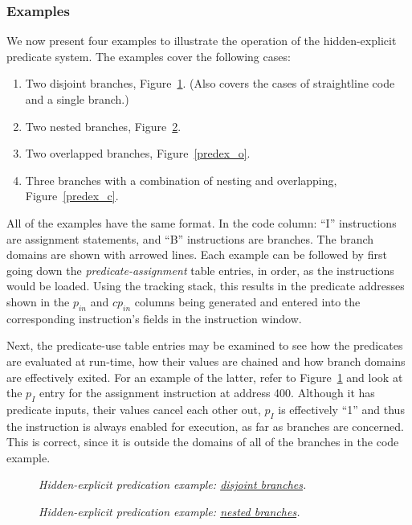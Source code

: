 \documentclass[10pt,dvips]{article}
\begin{document}
\subsubsection{Examples}
We now present four examples to illustrate the operation of the hidden-explicit
predicate system. The examples cover the following cases:
\begin{enumerate}
\item Two disjoint branches, Figure~\ref{predex_d}. (Also covers the cases of straightline code and a single branch.)
\item Two nested branches, Figure~\ref{predex_n}.
\item Two overlapped branches, Figure~\ref{predex_o}.
\item Three branches with a combination of nesting and overlapping, Figure~\ref{predex_c}.
\end{enumerate}

All of the examples have the same format. In the code column: ``I'' instructions are
assignment statements, and ``B'' instructions are branches. The branch domains are
shown with arrowed lines. Each example can be followed by first going down the
{\it predicate-assignment} table entries, in order, as the instructions would
be loaded. Using the tracking stack, this results in the predicate addresses shown
in the $p_{in}$ and $cp_{in}$ columns being generated and entered into the corresponding
instruction's fields in the instruction window.

Next, the predicate-use table entries may be examined to see how the predicates
are evaluated at run-time, how their values are chained and how branch domains
are effectively exited. For an example of the latter, refer to Figure~\ref{predex_d}
and look at the $p_I$ entry for the assignment instruction at address 400.
Although it has predicate inputs, their values cancel each other out, $p_I$
is effectively ``1'' and thus the instruction is always enabled for
execution, as far as branches are concerned. This is correct, since it is
outside the domains of all of the branches in the code example.

\begin{figure}
\centering
{}
\caption{{\em Hidden-explicit predication example: \underline{disjoint branches}.} }
\label{predex_d}
\end{figure}

\begin{figure}
\centering
{}
\caption{{\em Hidden-explicit predication example: \underline{nested branches}.} }
\label{predex_n}
\end{figure}
\end{document}
